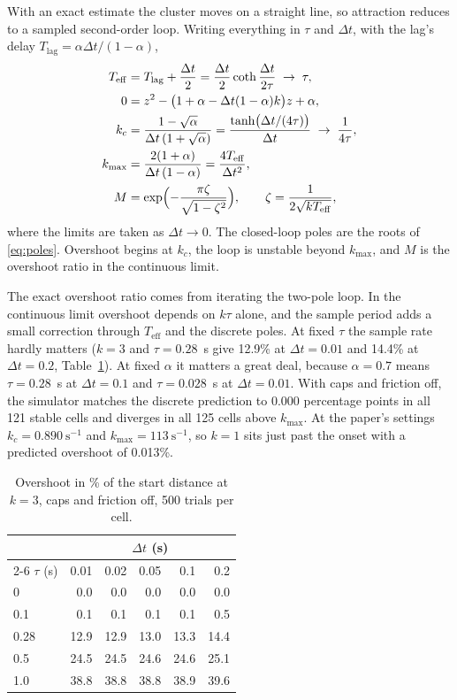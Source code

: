 \documentclass[10pt,letterpaper]{article}
\newcommand{\Teff}{T_{\mathrm{eff}}}
\newcommand{\Tlag}{T_{\mathrm{lag}}}
\newcommand{\kmax}{k_{\max}}
\newcommand{\dt}{\Delta t}
\begin{document}
With an exact estimate the cluster moves on a straight line, so attraction reduces to a sampled second-order loop. Writing everything in $\tau$ and $\dt$, with the lag's delay $\Tlag = \alpha\dt/(1-\alpha)$,
\begin{align}
\Teff &= \Tlag + \frac{\dt}{2} = \frac{\dt}{2}\coth\frac{\dt}{2\tau} \;\to\; \tau, \label{eq:teff}\\
0 &= z^2 - \bigl(1 + \alpha - \dt(1-\alpha)k\bigr)z + \alpha, \label{eq:poles}\\
k_c &= \frac{1-\sqrt{\alpha}}{\dt\,(1+\sqrt{\alpha})} = \frac{\tanh\bigl(\dt/(4\tau)\bigr)}{\dt} \;\to\; \frac{1}{4\tau}, \label{eq:kc}\\
\kmax &= \frac{2(1+\alpha)}{\dt\,(1-\alpha)} = \frac{4\Teff}{\dt^2}, \label{eq:kmax}\\
M &= \exp\Bigl(-\frac{\pi\zeta}{\sqrt{1-\zeta^2}}\Bigr), \qquad \zeta = \frac{1}{2\sqrt{k\Teff}}, \label{eq:M}
\end{align}
where the limits are taken as $\dt \to 0$. The closed-loop poles are the roots of \eqref{eq:poles}. Overshoot begins at $k_c$, the loop is unstable beyond $\kmax$, and $M$ is the overshoot ratio in the continuous limit.

The exact overshoot ratio comes from iterating the two-pole loop. In the continuous limit overshoot depends on $k\tau$ alone, and the sample period adds a small correction through $\Teff$ and the discrete poles. At fixed $\tau$ the sample rate hardly matters ($k = 3$ and $\tau = 0.28$~s give 12.9\% at $\dt = 0.01$ and 14.4\% at $\dt = 0.2$, Table~\ref{tab:overshoot}). At fixed $\alpha$ it matters a great deal, because $\alpha = 0.7$ means $\tau = 0.28$~s at $\dt = 0.1$ and $\tau = 0.028$~s at $\dt = 0.01$. With caps and friction off, the simulator matches the discrete prediction to 0.000 percentage points in all 121 stable cells and diverges in all 125 cells above $\kmax$. At the paper's settings $k_c = 0.890~\mathrm{s^{-1}}$ and $\kmax = 113~\mathrm{s^{-1}}$, so $k = 1$ sits just past the onset with a predicted overshoot of 0.013\%.

\begin{table}[htbp]
\centering\small
\caption{Overshoot in \% of the start distance at $k = 3$, caps and friction off, 500 trials per cell.}
\label{tab:overshoot}
\begin{tabular}{@{}l rrrrr@{}}
\toprule
 & \multicolumn{5}{c}{$\dt$ (s)} \\
\cmidrule(l){2-6}
$\tau$ (s) & 0.01 & 0.02 & 0.05 & 0.1 & 0.2 \\
\midrule
0 & 0.0 & 0.0 & 0.0 & 0.0 & 0.0 \\
0.1 & 0.1 & 0.1 & 0.1 & 0.1 & 0.5 \\
0.28 & 12.9 & 12.9 & 13.0 & 13.3 & 14.4 \\
0.5 & 24.5 & 24.5 & 24.6 & 24.6 & 25.1 \\
1.0 & 38.8 & 38.8 & 38.8 & 38.9 & 39.6 \\
\bottomrule
\end{tabular}
\end{table}
\end{document}
